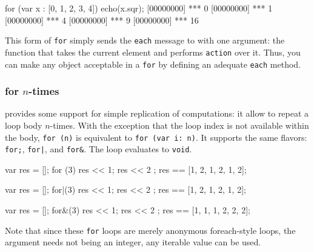 \begin{urbiscript}[firstnumber=last]
for (var x : [0, 1, 2, 3, 4])
  echo(x.sqr);
[00000000] *** 0
[00000000] *** 1
[00000000] *** 4
[00000000] *** 9
[00000000] *** 16
\end{urbiscript}

This form of \lstinline|for| simply sends the \lstinline|each| message
to  with one argument: the function that takes the
current element and performs \lstinline|action| over it. Thus, you can
make any object acceptable in a \lstinline|for| by defining an
adequate \lstinline|each| method.


\subsubsection{for $n$-times}
\label{sec:lang:for:n}

\us provides some support for simple replication of computations: it
allow to repeat a loop body $n$-times.  With the exception that the
loop index is not available within the body, \lstinline|for (n)| is
equivalent to \lstinline|for (var i: n)|.  It supports the same
flavors: \lstinline|for;|, \lstinline{for|}, and \lstinline|for&|. The
loop evaluates to \lstinline|void|.

\begin{urbiassert}[firstnumber=last]
{ var res = []; for (3) { res << 1; res << 2 } ; res }
        == [1, 2, 1, 2, 1, 2];

{ var res = []; for|(3) { res << 1; res << 2 } ; res }
        == [1, 2, 1, 2, 1, 2];

{ var res = []; for&(3) { res << 1; res << 2 } ; res }
        == [1, 1, 1, 2, 2, 2];
\end{urbiassert}

Note that since these \lstinline|for| loops are merely anonymous
foreach-style loops, the argument needs not being an integer, any
iterable value can be used.

